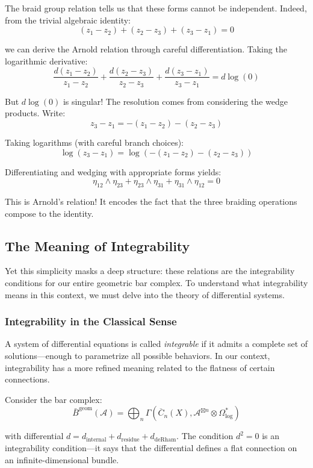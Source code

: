 The braid group relation tells us that these forms cannot be independent. Indeed, from the trivial algebraic identity:
$$(z_1 - z_2) + (z_2 - z_3) + (z_3 - z_1) = 0$$

we can derive the Arnold relation through careful differentiation. Taking the logarithmic derivative:
$$\frac{d(z_1 - z_2)}{z_1 - z_2} + \frac{d(z_2 - z_3)}{z_2 - z_3} + \frac{d(z_3 - z_1)}{z_3 - z_1} = d\log(0)$$

But $d\log(0)$ is singular! The resolution comes from considering the wedge products. Write:
$$z_3 - z_1 = -(z_1 - z_2) - (z_2 - z_3)$$

Taking logarithms (with careful branch choices):
$$\log(z_3 - z_1) = \log(-(z_1 - z_2) - (z_2 - z_3))$$

Differentiating and wedging with appropriate forms yields:
$$\eta_{12} \wedge \eta_{23} + \eta_{23} \wedge \eta_{31} + \eta_{31} \wedge \eta_{12} = 0$$

This is Arnold's relation! It encodes the fact that the three braiding operations compose to the identity.

\subsection{The Meaning of Integrability}

Yet this simplicity masks a deep structure: these relations are the integrability conditions for our entire geometric bar complex. To understand what integrability means in this context, we must delve into the theory of differential systems.

\subsubsection{Integrability in the Classical Sense}

A system of differential equations is called \emph{integrable} if it admits a complete set of solutions—enough to parametrize all possible behaviors. In our context, integrability has a more refined meaning related to the flatness of certain connections.

Consider the bar complex:
$$\bar{B}^{\text{geom}}(\mathcal{A}) = \bigoplus_n \Gamma(\overline{C}_n(X), \mathcal{A}^{\boxtimes n} \otimes \Omega^*_{\log})$$

with differential $d = d_{\text{internal}} + d_{\text{residue}} + d_{\text{deRham}}$. The condition $d^2 = 0$ is an integrability condition—it says that the differential defines a flat connection on an infinite-dimensional bundle.

